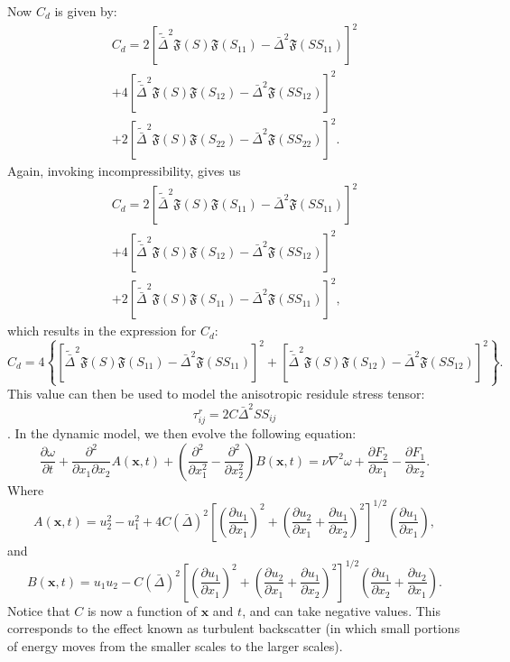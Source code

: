 \documentclass[11pt,a4paper]{article}
\begin{document}
Now $C_d$ is given by:
\begin{multline*}
C_d = 2\left[\tilde{\bar{\Delta}}^2\mathfrak{F}\left(S\right)\mathfrak{F}\left({S}_{11}\right) - \bar{\Delta}^2\mathfrak{F}\left(S{S}_{11}\right)\right]^2\\
+4\left[\tilde{\bar{\Delta}}^2\mathfrak{F}\left(S\right)\mathfrak{F}\left({S}_{12}\right) - \bar{\Delta}^2\mathfrak{F}\left(S{S}_{12}\right)\right]^2\\
+2\left[\tilde{\bar{\Delta}}^2\mathfrak{F}\left(S\right)\mathfrak{F}\left({S}_{22}\right) - \bar{\Delta}^2\mathfrak{F}\left(S{S}_{22}\right)\right]^2.
\end{multline*}
Again, invoking incompressibility, gives us
\begin{multline*}
C_d = 2\left[\tilde{\bar{\Delta}}^2\mathfrak{F}\left(S\right)\mathfrak{F}\left({S}_{11}\right) - \bar{\Delta}^2\mathfrak{F}\left(S{S}_{11}\right)\right]^2\\
+4\left[\tilde{\bar{\Delta}}^2\mathfrak{F}\left(S\right)\mathfrak{F}\left({S}_{12}\right) - \bar{\Delta}^2\mathfrak{F}\left(S{S}_{12}\right)\right]^2\\
+2\left[\tilde{\bar{\Delta}}^2\mathfrak{F}\left(S\right)\mathfrak{F}\left({S}_{11}\right) - \bar{\Delta}^2\mathfrak{F}\left(S{S}_{11}\right)\right]^2,
\end{multline*}
which results in the expression for $C_d$:
\begin{equation}\label{C_d}
C_d = 4\left\{\left[\tilde{\bar{\Delta}}^2\mathfrak{F}\left(S\right)\mathfrak{F}\left({S}_{11}\right) - \bar{\Delta}^2\mathfrak{F}\left(S{S}_{11}\right)\right]^2+\left[\tilde{\bar{\Delta}}^2\mathfrak{F}\left(S\right)\mathfrak{F}\left({S}_{12}\right) - \bar{\Delta}^2\mathfrak{F}\left(S{S}_{12}\right)\right]^2\right\}.
\end{equation}
This value can then be used to model the anisotropic residule stress tensor:
$$\tau_{ij}^r = 2C\bar{\Delta}^2{S}{S}_{ij}$$.
In the dynamic model, we then evolve the following equation:
$$\frac{\partial \omega}{\partial t}  + \frac{\partial^2 }{\partial x_1\partial x_2}A(\boldsymbol{x}, t) + \left(\frac{\partial^2}{\partial x_1^2} - \frac{\partial^2}{\partial x_2^2}\right)B(\boldsymbol{x}, t) = \nu{\nabla}^2\omega+\frac{\partial F_2}{\partial x_1} - \frac{\partial F_1}{\partial x_2}.$$
Where 
$$A(\boldsymbol{x}, t) = u_2^2 - u_1^2 + 4C(\bar{\Delta})^2\left[\left( \frac{\partial {u}_1}{\partial x_1}\right)^2+\left( \frac{\partial {u}_2}{\partial x_1} + \frac{\partial {u}_1}{\partial x_2}\right)^2 \right]^{1/2}\left(\frac{\partial {u}_1}{\partial x_1}\right),$$
and
$$B(\boldsymbol{x}, t) = u_1u_2 -C(\bar{\Delta})^2\left[\left( \frac{\partial {u}_1}{\partial x_1}\right)^2+\left( \frac{\partial {u}_2}{\partial x_1} + \frac{\partial {u}_1}{\partial x_2}\right)^2 \right]^{1/2}\left( \frac{\partial {u}_1}{\partial x_2} + \frac{\partial {u}_2}{\partial x_1}\right).$$
Notice that $C$ is now a function of $\boldsymbol{x}$ and $t$, and can take negative values. This corresponds to the effect known as turbulent backscatter (in which small portions of energy moves from the smaller scales to the larger scales).
\end{document}
